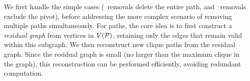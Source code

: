 

%
We first handle the simple cases (\hold{-}\hold\ removals delete the entire path, and \hold{-}\pivot\ removals exclude the pivot), before addressing the more complex scenario of removing multiple \pivot{-}\pivot paths simultaneously. 
%
For \pivot{-}\pivot paths, the core idea is to first construct a \textit{residual graph} from vertices in $V(\TPath)$, retaining only the edges that remain valid within this subgraph.
%
We then reconstruct new clique paths from the residual graph. 
Since the residual graph is small (no larger than the maximum clique in the graph), this reconstruction can be performed efficiently, avoiding redundant computation.


% 



